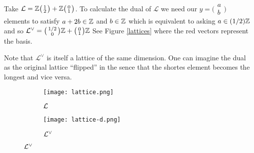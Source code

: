 \begin{example}\label{ld-ex}
    Take $\mathcal{L}= \mathbb{Z} 
        \big(\begin{smallmatrix} 1\\2 \end{smallmatrix}\big) + 
        \mathbb{Z} \big(\begin{smallmatrix} 0\\ 1 \end{smallmatrix}\big)$.
        To calculate the dual of $\mathcal{L}$ we need our $y = \big(\begin{smallmatrix}
          a\\b\end{smallmatrix}\big)$ elements to satisfy $a +2b \in \mathbb{Z}$ and $b \in \mathbb{Z}$ which is equivalent to asking $a \in (1/2)\mathbb{Z}$ and so $\mathcal{L}^{\vee} = \big(\begin{smallmatrix}
          1/2\\0
        \end{smallmatrix}\big)\mathbb{Z} + \big(\begin{smallmatrix}
          0\\1
        \end{smallmatrix}\big) \mathbb{Z}$
        See Figure \ref{lattices} where the red vectors represent the basis.
\end{example}

Note that $\mathcal{L}^{\vee}$ is itself a lattice of the same dimension. One can imagine the dual as the original lattice ``flipped'' in the sence that the shortes element becomes the longest and vice versa.
\begin{figure}[ht]
    \caption{Lattice $\Ll$ from example \ref{ld-ex} and its dual.}
        \label{lattices}
        \centering
        \begin{subfigure}{.5\textwidth} 
                \centering
                \texttt{[image: lattice.png]}
                \caption{$\Ll$}
        \end{subfigure}%
        \begin{subfigure}{.5\textwidth}
                \centering
                \texttt{[image: lattice-d.png]}
                \caption{$\mathcal{L}^{\vee}$}
        \end{subfigure}
\end{figure}



